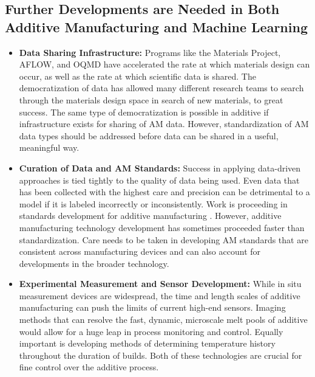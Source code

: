 \subsection{Further Developments are Needed in Both Additive Manufacturing and Machine Learning}
\begin{itemize}
	\item \textbf{Data Sharing Infrastructure:} Programs like the Materials Project, AFLOW, and OQMD have accelerated the rate at which materials design can occur, as well as the rate at which scientific data is shared. The democratization of data has allowed many different research teams to search through the materials design space in search of new materials, to great success. The same type of democratization is possible in additive if infrastructure exists for sharing of AM data. However, standardization of AM data types should be addressed before data can be shared in a useful, meaningful way.

	\item \textbf{Curation of Data and AM Standards:} Success in applying data-driven approaches is tied tightly to the quality of data being used. Even data that has been collected with the highest care and precision can be detrimental to a model if it is labeled incorrectly or inconsistently. Work is proceeding in standards development for additive manufacturing \cite{Seifi2016}. However, additive manufacturing technology development has sometimes proceeded faster than standardization. Care needs to be taken in developing AM standards that are consistent across manufacturing devices and can also account for developments in the broader technology.
	
	\item \textbf{Experimental Measurement and Sensor Development:} While in situ measurement devices are widespread, the time and length scales of additive manufacturing can push the limits of current high-end sensors. Imaging methods that can resolve the fast, dynamic, microscale melt pools of additive would allow for a huge leap in process monitoring and control. Equally important is developing methods of determining temperature history throughout the duration of builds. Both of these technologies are crucial for fine control over the additive process. 


\end{itemize}
